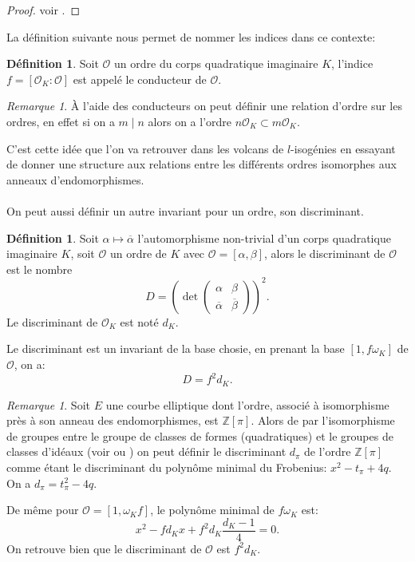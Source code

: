 \documentclass[10pt,a4paper]{book}
\theoremstyle{plain}
\theoremstyle{definition}
\theoremstyle{definition}
\theoremstyle{definition}
\theoremstyle{definition}
\newtheorem{defi}[thm]{Définition}
\theoremstyle{remark}
\newtheorem{rem}[thm]{Remarque}
\theoremstyle{remark}
\theoremstyle{definition}
\begin{document}
\begin{proof}
voir \cite[lemma 7.7.2]{Cox89}.
\end{proof}

La définition suivante nous permet de nommer les indices dans ce contexte:
\begin{defi}
Soit $\mathcal{O}$ un ordre du corps quadratique imaginaire $K$, l'indice $f=[\mathcal{O}_K : \mathcal{O}]$ est appelé le conducteur de $\mathcal{O}$.
\end{defi}

\begin{rem}
\`A l'aide des conducteurs on peut définir une relation d'ordre sur les ordres, en effet si on a $m \mid n$ alors on a l'ordre $n\mathcal{O}_K \subset m\mathcal{O}_K$.
\end{rem}

C'est cette idée que l'on va retrouver dans les volcans de $l$-isogénies en essayant de donner une structure aux relations entre les différents ordres isomorphes aux anneaux d'endomorphismes.
\\
\\
On peut aussi définir un autre invariant pour un ordre, son discriminant.

\begin{defi}
Soit $\alpha \mapsto \overline{\alpha}$ l'automorphisme non-trivial d'un corps quadratique imaginaire $K$, soit $\mathcal{O}$ un ordre de $K$ avec $\mathcal{O}=[\alpha, \beta]$, alors le discriminant de $\mathcal{O}$ est le nombre 
\[D= \left( \det \left( 
\begin{array}{cc}
\alpha & \beta\\
\overline{\alpha} & \overline{\beta}
\end{array} 
\right) \right)^2. \]
Le discriminant de $\mathcal{O}_K$ est noté $d_K$.
\end{defi}
Le discriminant est un invariant de la base chosie, en prenant la base $[1, f 
\omega_K]$ de $\mathcal{O}$, on a:
\[D=f^2d_K.\]


\begin{rem}
\label{rem:def:dpi}
Soit $E$ une courbe elliptique dont l'ordre, associé à isomorphisme près à son 
anneau des endomorphismes, est $\mathbb{Z}[\pi]$. Alors de par l'isomorphisme 
de groupes entre le groupe de classes de formes (quadratiques) et le groupes de
classes d'idéaux (voir \cite[Theorem 7.7]{Cox89} ou \cite[Theorem 5.2.8]{Cohen96}) on 
peut définir le discriminant $d_{\pi}$ de l'ordre $\mathbb{Z}[\pi]$ comme étant
le discriminant du polynôme minimal du Frobenius: $x^2-t_{\pi}+4q$. On a 
$d_{\pi} =t_{\pi}^2-4q$.

De même pour $\mathcal{O}=[ 1, \omega_K f ]$, le polynôme 
minimal de $f \omega_K$ est:
\[
x^2-fd_Kx+f^2d_K\frac{d_K-1}{4}=0.
\]
On retrouve bien que le discriminant de $\mathcal{O}$ est $f^2d_K$.
\end{rem}
\end{document}
